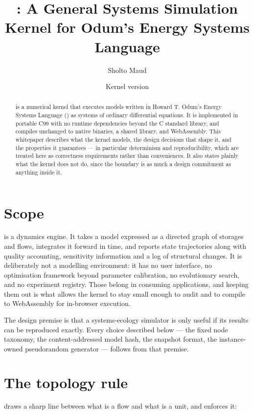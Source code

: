 \documentclass[11pt,a4paper]{article}
\title{\gssk: A General Systems Simulation Kernel for Odum's Energy Systems Language}
\author{Sholto Maud}
\date{Kernel version \kernelversion}
\begin{document}
\maketitle

\begin{abstract}
\gssk{} is a numerical kernel that executes models written in Howard T. Odum's Energy Systems Language (\esl) as systems of ordinary differential equations. It is implemented in portable C99 with no runtime dependencies beyond the C standard library, and compiles unchanged to native binaries, a shared library, and WebAssembly. This whitepaper describes what the kernel models, the design decisions that shape it, and the properties it guarantees --- in particular determinism and reproducibility, which are treated here as correctness requirements rather than conveniences. It also states plainly what the kernel does not do, since the boundary is as much a design commitment as anything inside it.
\end{abstract}

\tableofcontents

\section{Scope}

\gssk{} is a dynamics engine. It takes a model expressed as a directed graph of storages and flows, integrates it forward in time, and reports state trajectories along with quality accounting, sensitivity information and a log of structural changes. It is deliberately not a modelling environment: it has no user interface, no optimisation framework beyond parameter calibration, no evolutionary search, and no experiment registry. Those belong in consuming applications, and keeping them out is what allows the kernel to stay small enough to audit and to compile to WebAssembly for in-browser execution.

The design premise is that a systems-ecology simulator is only useful if its results can be reproduced exactly. Every choice described below --- the fixed node taxonomy, the content-addressed model hash, the snapshot format, the instance-owned pseudorandom generator --- follows from that premise.

\section{The topology rule}

\esl{} draws a sharp line between what is a flow and what is a unit, and \gssk{} enforces it:
\end{document}

